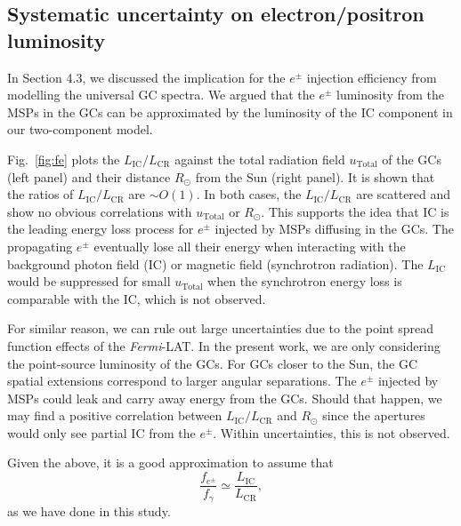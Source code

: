 \documentclass[doublespace,nopageskip]{VTthesis} %
\begin{document}
\begin{appendices}
\clearpage

\section{Systematic uncertainty on electron/positron luminosity }\label{appx:system_fe}

In Section 4.3, we discussed the implication for the $e^\pm$ injection efficiency from modelling the universal GC spectra. We argued that the $e^\pm$ luminosity from the MSPs in the GCs can be approximated by the luminosity of the IC component in our two-component model. 

Fig.~\ref{fig:fe} plots the $L_\mathrm{IC}/L_\mathrm{CR}$ against the total radiation field $u_\mathrm{Total}$ of the GCs (left panel) and their distance $R_\odot$ from the Sun (right panel). It is shown that the ratios of $L_\mathrm{IC}/L_\mathrm{CR}$ are $\sim O(1)$. In both cases, the $L_\mathrm{IC}/L_\mathrm{CR}$ are scattered and show no obvious correlations with $u_\mathrm{Total}$ or $R_\odot$. This supports the idea that IC is the leading energy loss process for $e^\pm$ injected by MSPs diffusing in the GCs. The propagating $e^\pm$ eventually lose all their energy when interacting with the background photon field (IC) or magnetic field (synchrotron radiation). The $L_\mathrm{IC}$ would be suppressed for small $u_\mathrm{Total}$ when the synchrotron energy loss is comparable with the IC, which is not observed. 

For similar reason, we can rule out large uncertainties due to the point spread function effects of the \textit{Fermi}-LAT. In the present work, we are only considering the point-source luminosity of the GCs. For GCs closer to the Sun, the GC spatial extensions correspond to larger angular separations. The $e^\pm$ injected by MSPs could leak and carry away energy from the GCs. Should that happen, we may find a positive correlation between $L_\mathrm{IC}/L_\mathrm{CR}$ and $R_\odot$ since the apertures would only see partial IC from the $e^\pm$. Within uncertainties, this is not observed.

Given the above, it is a good approximation to assume that
\begin{equation}
    \dfrac{f_{e^\pm}}{f_\gamma} \simeq \dfrac{L_\mathrm{IC}}{L_\mathrm{CR}},
\end{equation}
as we have done in this study. 


\end{appendices}
\end{document}
